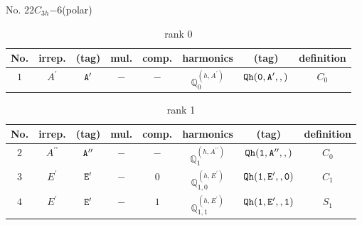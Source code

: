 \documentclass[fleqn,8pt]{jsarticle}
\begin{document}
\setcounter{MaxMatrixCols}{16}

\begin{center}
\LARGE
No. 22\quad$C_{3h}$\quad$-6$\quad[ hexagonal ] (polar)
\end{center}
\begin{table}[ht!]
\begin{center}
\caption{rank 0}
\renewcommand{\arraystretch}{1.3}
\begin{tabular}{cccccccc} \hline \hline
No. & irrep. & (tag) & mul. & comp. & harmonics & (tag) & definition \\ \hline
$ 1 $ & $ A^{\prime} $ & $ {\tt A'} $ & $ - $ & $ - $ & $ \mathbb{Q}_{0}^{(h,A^{\prime})} $ & $ {\tt Qh(0,A',,)} $ & $ C_{0} $ \\
 \hline \hline
\end{tabular}
\end{center}
\end{table}
\begin{table}[ht!]
\begin{center}
\caption{rank 1}
\renewcommand{\arraystretch}{1.3}
\begin{tabular}{cccccccc} \hline \hline
No. & irrep. & (tag) & mul. & comp. & harmonics & (tag) & definition \\ \hline
$ 2 $ & $ A^{\prime\prime} $ & $ {\tt A''} $ & $ - $ & $ - $ & $ \mathbb{Q}_{1}^{(h,A^{\prime\prime})} $ & $ {\tt Qh(1,A'',,)} $ & $ C_{0} $ \\
$ 3 $ & $ E^{\prime} $ & $ {\tt E'} $ & $ - $ & $ 0 $ & $ \mathbb{Q}_{1,0}^{(h,E^{\prime})} $ & $ {\tt Qh(1,E',,0)} $ & $ C_{1} $ \\
$ 4 $ & $ E^{\prime} $ & $ {\tt E'} $ & $ - $ & $ 1 $ & $ \mathbb{Q}_{1,1}^{(h,E^{\prime})} $ & $ {\tt Qh(1,E',,1)} $ & $ S_{1} $ \\
 \hline \hline
\end{tabular}
\end{center}
\end{table}
\end{document}
